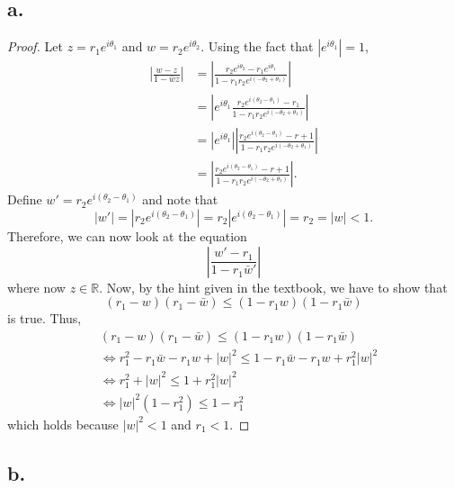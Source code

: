 \documentclass{article}
\begin{document}
\subsection*{a.}
\begin{proof}
Let $z = r_1e^{i \theta_1}$ and $w = r_2e^{i \theta_2}$. Using the fact that $\left|e^{i \theta_1}\right| = 1$, 
\begin{align*}
    \left|\frac{w - z}{1 - \bar{w}z} \right| &= \left|\frac{r_2e^{i \theta_2} - r_1e^{i \theta_1}}{1 - r_1r_2e^{i(-\theta_2 + \theta_1)}} \right| \\
    &= \left|e^{i \theta_1}\frac{r_2e^{i(\theta_2 - \theta_1)} - r_1}{1 - r_1r_2e^{i(-\theta_2 + \theta_1)}}\right|\\
    &= \left|e^{i \theta_1} \right|\left|\frac{r_2e^{i(\theta_2 - \theta_1)} - r+1}{1 - r_1r_2e^{i(-\theta_2 + \theta_1)}} \right| \\
    &=\left|\frac{r_2e^{i(\theta_2 - \theta_1)} - r+1}{1 - r_1r_2e^{i(-\theta_2 + \theta_1)}} \right|. 
\end{align*}
Define $w' = r_2e^{i(\theta_2 - \theta_1)}$ and note that \[|w'| = |r_2e^{i(\theta_2 - \theta_1)}| = r_2|e^{i(\theta_2 - \theta_1)}| = r_2 = |w| < 1. \]
Therefore, we can now look at the equation 
\[
    \left|\frac{w' - r_1}{1 - r_1\bar{w}'} \right|
\]
where now $z \in \mathbb{R}$. Now, by the hint given in the textbook, we have to show that \[
    (r_1 - w)(r_1 - \bar{w}) \leq (1 - r_1w)(1 - r_1\bar{w})
    \] is true. Thus, 
    \begin{align*}
        & (r_1 - w)(r_1 - \bar{w}) \leq (1 - r_1w)(1 - r_1\bar{w}) \\
        &\iff r_1^2 - r_1\bar{w} - r_1w + |w|^2 \leq 1 - r_1\bar{w} - r_1w +r_1^2|w|^2 \\
        &\iff r_1^2 + |w|^2 \leq 1 + r_1^2|w|^2 \\
        &\iff |w|^2(1 - r_1^2) \leq 1 - r_1^2
    \end{align*}
    which holds because $|w|^2 < 1$ and $r_1 < 1$. 

\end{proof}
\subsection*{b.}
\end{document}
